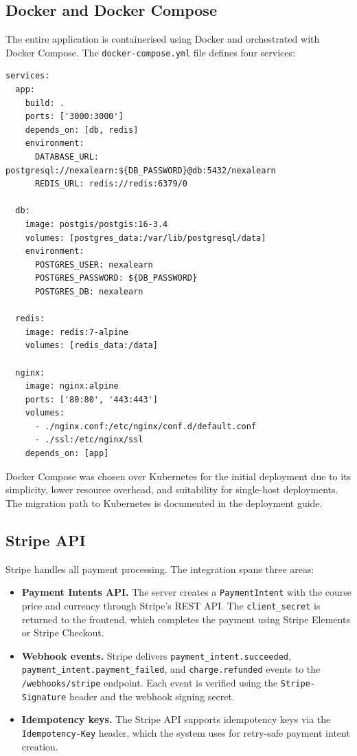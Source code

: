 \subsection{Docker and Docker Compose}
\label{subsec:app-docker}

The entire application is containerised using Docker and orchestrated with Docker Compose. The \texttt{docker-compose.yml} file defines four services:

\begin{lstlisting}[caption=NexaLearn Docker Compose services,label=lst:docker-compose]
services:
  app:
    build: .
    ports: ['3000:3000']
    depends_on: [db, redis]
    environment:
      DATABASE_URL: postgresql://nexalearn:${DB_PASSWORD}@db:5432/nexalearn
      REDIS_URL: redis://redis:6379/0

  db:
    image: postgis/postgis:16-3.4
    volumes: [postgres_data:/var/lib/postgresql/data]
    environment:
      POSTGRES_USER: nexalearn
      POSTGRES_PASSWORD: ${DB_PASSWORD}
      POSTGRES_DB: nexalearn

  redis:
    image: redis:7-alpine
    volumes: [redis_data:/data]

  nginx:
    image: nginx:alpine
    ports: ['80:80', '443:443']
    volumes:
      - ./nginx.conf:/etc/nginx/conf.d/default.conf
      - ./ssl:/etc/nginx/ssl
    depends_on: [app]
\end{lstlisting}

Docker Compose was chosen over Kubernetes for the initial deployment due to its simplicity, lower resource overhead, and suitability for single-host deployments. The migration path to Kubernetes is documented in the deployment guide.

\subsection{Stripe API}
\label{subsec:app-stripe}

Stripe handles all payment processing. The integration spans three areas:

\begin{itemize}
  \item \textbf{Payment Intents API.} The server creates a \texttt{PaymentIntent} with the course price and currency through Stripe's REST API. The \texttt{client\_secret} is returned to the frontend, which completes the payment using Stripe Elements or Stripe Checkout.
  \item \textbf{Webhook events.} Stripe delivers \texttt{payment\_intent.succeeded}, \texttt{payment\_intent.payment\_failed}, and \texttt{charge.refunded} events to the \texttt{/webhooks/stripe} endpoint. Each event is verified using the \texttt{Stripe-Signature} header and the webhook signing secret.
  \item \textbf{Idempotency keys.} The Stripe API supports idempotency keys via the \texttt{Idempotency-Key} header, which the system uses for retry-safe payment intent creation.
\end{itemize}

